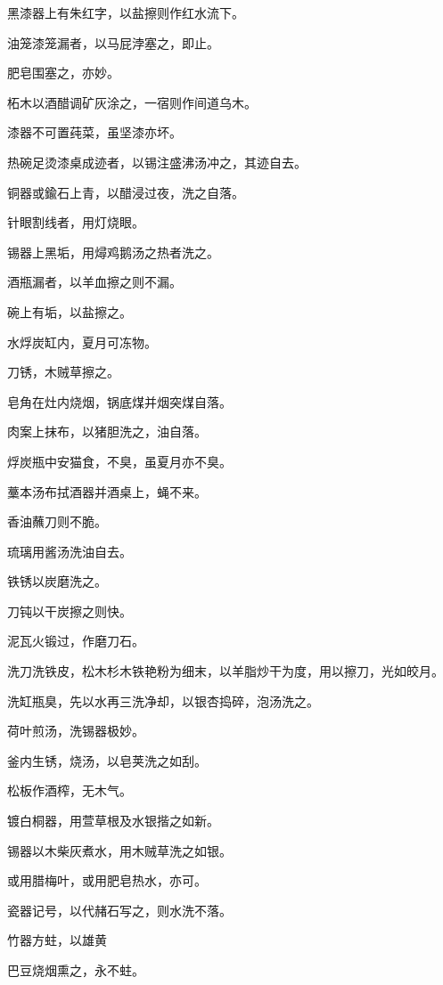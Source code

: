 \documentclass[a4paper,12pt,UTF8,twoside]{ctexbook}
\begin{document}
    黑漆器上有朱红字，以盐擦则作红水流下。
    
    油笼漆笼漏者，以马屁浡塞之，即止。
    
    肥皂围塞之，亦妙。
    
    柘木以酒醋调矿灰涂之，一宿则作间道乌木。
    
    漆器不可置莼菜，虽坚漆亦坏。
    
    热碗足烫漆桌成迹者，以锡注盛沸汤冲之，其迹自去。
    
    铜器或鍮石上青，以醋浸过夜，洗之自落。
    
    针眼割线者，用灯烧眼。
    
    锡器上黑垢，用燖鸡鹅汤之热者洗之。
    
    酒瓶漏者，以羊血擦之则不漏。
    
    碗上有垢，以盐擦之。
    
    水烰炭缸内，夏月可冻物。
    
    刀锈，木贼草擦之。
    
    皂角在灶内烧烟，锅底煤并烟突煤自落。
    
    肉案上抹布，以猪胆洗之，油自落。
    
    烰炭瓶中安猫食，不臭，虽夏月亦不臭。
    
    藳本汤布拭酒器并酒桌上，蝇不来。
    
    香油蘸刀则不脆。
    
    琉璃用酱汤洗油自去。
    
    铁锈以炭磨洗之。
    
    刀钝以干炭擦之则快。
    
    泥瓦火锻过，作磨刀石。
    
    洗刀洗铁皮，松木杉木铁艳粉为细末，以羊脂炒干为度，用以擦刀，光如皎月。
    
    洗缸瓶臭，先以水再三洗净却，以银杏捣碎，泡汤洗之。
    
    荷叶煎汤，洗锡器极妙。
    
    釜内生锈，烧汤，以皂荚洗之如刮。
    
    松板作酒榨，无木气。
    
    镀白桐器，用萱草根及水银揩之如新。
    
    锡器以木柴灰煮水，用木贼草洗之如银。
    
    或用腊梅叶，或用肥皂热水，亦可。
    
    瓷器记号，以代赭石写之，则水洗不落。
    
    竹器方蛀，以雄黄
    
    巴豆烧烟熏之，永不蛀。
    
\end{document}
